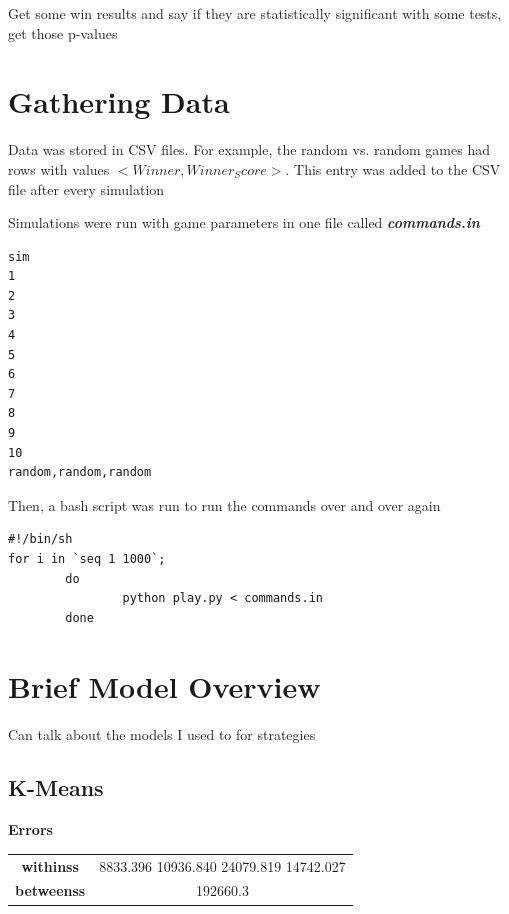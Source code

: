 \documentclass[11pt, oneside]{article}   	%
\begin{document}
Get some win results and say if they are statistically significant with some tests, get those p-values

\section{Gathering Data}

Data was stored in CSV files. For example, the random vs. random games had rows with values  $<Winner, Winner_Score>$. This entry was added to the CSV file after every simulation

Simulations were run with game parameters in one file called \textbf{\textit{commands.in}}

\begin{verbatim}
sim
1
2
3
4
5
6
7
8
9
10
random,random,random
\end{verbatim}

Then, a bash script was run to run the commands over and over again

\begin{verbatim}
#!/bin/sh
for i in `seq 1 1000`;
        do
                python play.py < commands.in
        done
\end{verbatim}


\section{Brief Model Overview}

Can talk about the models I used to for strategies

\subsection{K-Means}

\textbf{Errors}\\

\begin{center}
\begin{tabular}{||c | c ||}
\hline
 \textbf{withinss} & 8833.396 10936.840 24079.819 14742.027 \\ 
 \textbf{betweenss} & 192660.3 \\  
 \hline
\end{tabular}
\end{center}
\end{document}
